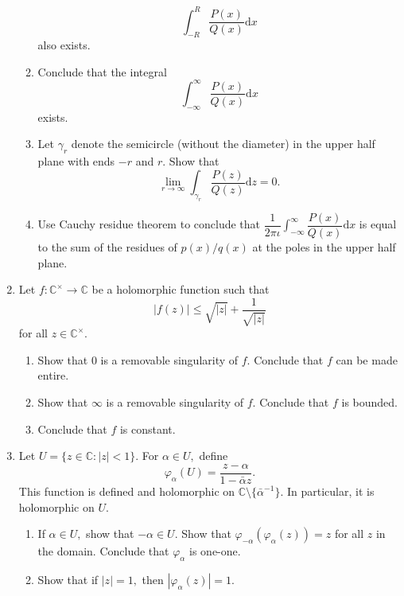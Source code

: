 \documentclass[12pt]{article}
\theoremstyle{definition}
\numberwithin{thm}{section}
\begin{document}
\begin{enumerate}
\begin{enumerate}
\begin{equation*}
			\int_{-R}^{R} \dfrac{P(x)}{Q(x)} {\mathrm{d}}x
		\end{equation*}
		also exists.
		\item Conclude that the integral
		\begin{equation*} 
			\int_{-\infty}^{\infty} \dfrac{P(x)}{Q(x)} {\mathrm{d}}x
		\end{equation*}
		exists.
		\item Let $\gamma_r$ denote the semicircle (without the diameter) in the upper half plane with ends $-r$ and $r.$ Show that 
		\begin{equation*} 
			\lim_{r\to \infty}\int_{\gamma_r}^{} \dfrac{P(z)}{Q(z)} {\mathrm{d}}z = 0.
		\end{equation*}
		\item Use Cauchy residue theorem to conclude that $\displaystyle\dfrac{1}{2\pi\iota}\int_{-\infty}^{\infty} \dfrac{P(x)}{Q(x)} {\mathrm{d}}x$ is equal to the sum of the residues of $p(x)/q(x)$ at the poles in the upper half plane.
	\end{enumerate}
	\item Let $f:\mathbb{C}^\times\to\mathbb{C}$ be a holomorphic function such that 
	\begin{equation*} 
		|f(z)| \le \sqrt{|z|} + \dfrac{1}{\sqrt{|z|}}
	\end{equation*}
	for all $z \in \mathbb{C}^\times.$ 
	\begin{enumerate}
		\item Show that $0$ is a removable singularity of $f.$ Conclude that $f$ can be made entire.
		\item Show that $\infty$ is a removable singularity of $f.$ Conclude that $f$ is bounded.
		\item Conclude that $f$ is constant.
	\end{enumerate}
	\item Let $U = \{z \in \mathbb{C} : |z| < 1\}.$ For $\alpha \in U,$ define
	\begin{equation*} 
		\varphi_\alpha(U) = \dfrac{z - \alpha}{1 - \bar{\alpha}z}.
	\end{equation*}
	This function is defined and holomorphic on $\mathbb{C}\setminus\{\bar{\alpha}^{-1}\}.$ In particular, it is holomorphic on $U.$
	\begin{enumerate}
		\item If $\alpha \in U,$ show that $-\alpha \in U.$ Show that $\varphi_{-\alpha}(\varphi_\alpha(z)) = z$ for all $z$ in the domain. Conclude that $\varphi_\alpha$ is one-one.
		\item Show that if $|z| = 1,$ then $\left|\varphi_\alpha(z)\right| = 1.$

\end{enumerate}
\end{enumerate}
\end{document}
